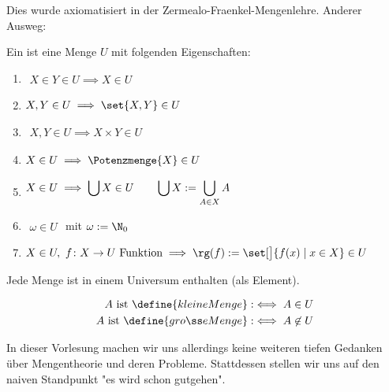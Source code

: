 Dies wurde axiomatisiert in der Zermealo-Fraenkel-Mengenlehre.\nl
Anderer Ausweg: 
\begin{definition}
	Ein  ist eine Menge $U$ mit folgenden Eigenschaften:
	\begin{enumerate}[label=(\roman*)]
		\item $\begin{aligned}
			X\in Y\in U\implies X\in U
		\end{aligned}$
		\item $\begin{aligned}
			X,Y\in U\implies\set{X,Y}\in U
		\end{aligned}$
		\item $\begin{aligned}
			X,Y\in U\implies X\times Y\in U
		\end{aligned}$
		\item $\begin{aligned}
			X\in U\implies\Potenzmenge{X}\in U
		\end{aligned}$
		\item $\begin{aligned}
			X\in U\implies \bigcup X\in U\qquad\mit \bigcup X:=\bigcup\limits_{A\in X}A
		\end{aligned}$
		\item $\begin{aligned}
			\omega\in U
		\end{aligned}$ mit $\omega:=\N_0$
		\item $\begin{aligned}
			X\in U,~f\colon X\to U\text{ Funktion}\implies\rg(f):=\set[\big]{f(x)\mid x\in X}\in U
		\end{aligned}$
	\end{enumerate}
\end{definition}

\begin{axiom}
	Jede Menge ist in einem Universum enthalten (als Element).
\end{axiom}

\begin{definition}
	\begin{align*}\index{kleine Menge}\index{große Menge}
		A\text{ ist }\define{kleine Menge} &:\iff A\in U\\
		A\text{ ist }\define{große Menge} &:\iff A\not\in U\\
	\end{align*}
\end{definition}

In dieser Vorlesung machen wir uns allerdings keine weiteren tiefen Gedanken über Mengentheorie und deren Probleme.
Stattdessen stellen wir uns auf den naiven Standpunkt
"es wird schon gutgehen".


